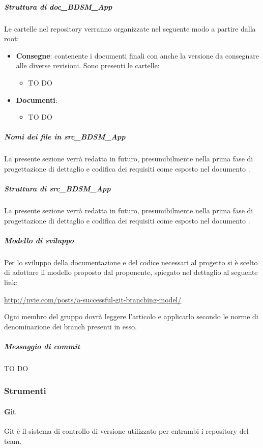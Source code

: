 				\subparagraph{Struttura di doc\_BDSM\_App}
				Le cartelle nel repository verranno organizzate nel seguente modo a partire dalla root:
					\begin{itemize}
						\item \textbf{Consegne}: contenente i documenti finali con anche la versione da consegnare alle diverse revisioni. Sono presenti le cartelle:
							\begin{itemize}
								\item TO DO
							\end{itemize}
							
							
						\item \textbf{Documenti}:
							\begin{itemize}
								\item TO DO
							\end{itemize}
					\end{itemize}
					
				\subparagraph{Nomi dei file in src\_BDSM\_App}
				La presente sezione verrà redatta in futuro, presumibilmente nella prima fase di progettazione di dettaglio e codifica dei requisiti come esposto nel documento \docNameVersionPdP.
				\subparagraph{Struttura di src\_BDSM\_App}
				La presente sezione verrà redatta in futuro, presumibilmente nella prima fase di progettazione di dettaglio e codifica dei requisiti come esposto nel documento \docNameVersionPdP.

				\subparagraph{Modello di sviluppo}
				Per lo sviluppo della documentazione e del codice necessari al progetto si è scelto di adottare il modello proposto dal proponente, spiegato nel dettaglio al seguente link:
					\begin{center}
						\url{http://nvie.com/posts/a-successful-git-branching-model/}
					\end{center}
					Ogni membro del gruppo dovrà leggere l'articolo e applicarlo secondo le norme di denominazione dei branch presenti in esso.

				\subparagraph{Messaggio di commit} \label{sec:messaggio_di_commit}
				TO DO




		\subsubsection{Strumenti}
			\paragraph{Git}
			Git è il sistema di controllo di versione utilizzato per entrambi i repository del team.	
